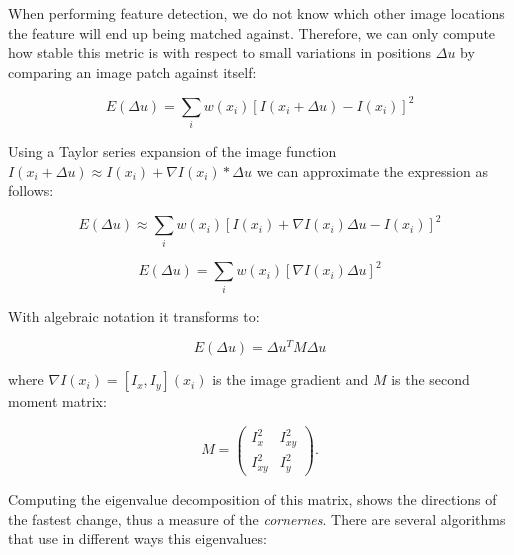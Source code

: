 When performing feature detection, we do not know which other image locations the feature will end up being matched against. Therefore, we can only compute how stable this metric is with respect to small variations in positions $\Delta u$ by comparing an image patch against itself:

$$ E( \Delta u) = \sum_{i} w(x_{i}) [I(x_{i}+\Delta u)-I(x_{i})]^{2}$$

Using a Taylor series expansion of the image function $I(x_{i}+\Delta u) \approx I(x_{i}) + \nabla I(x_{i})*\Delta u  $ we can approximate the expression as follows:

$$ E( \Delta u) \approx \sum_{i} w(x_{i}) [I(x_{i})+\nabla I(x_{i}) \Delta u-I(x_{i})]^{2}$$


$$ E( \Delta u) = \sum_{i} w(x_{i}) [\nabla I(x_{i}) \Delta u]^{2}$$

With algebraic notation it transforms to:

$$ E( \Delta u) = \Delta u^{T} M \Delta u$$

where $ \nabla I(x_{i}) = [I_{x},I_{y}](x_{i}) $ is the image gradient and $M$ is the second moment matrix:

\[ M = \left( \begin{array}{ccc}
I_{x}^{2} & I_{xy}^{2} \\
I_{xy}^{2} & I_{y}^{2} \end{array} \right).\] 

Computing the eigenvalue decomposition of this matrix, shows the directions of the fastest change, thus a measure of the \textit{cornernes}. There are several algorithms that use in different ways this eigenvalues:

%
%
%
%





